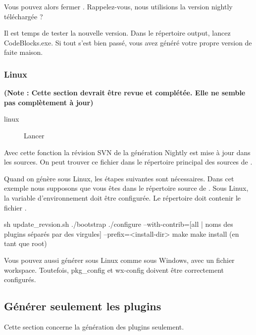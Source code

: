 Vous pouvez alors fermer \codeblocks. Rappelez-vous, nous utilisions la version nightly téléchargée ?

Il est temps de tester la nouvelle version. Dans le répertoire output, lancez CodeBlocks.exe. Si tout s'est bien passé, vous avez généré votre propre version de \codeblocks faite maison.

\subsubsection{Linux}

\textbf{(Note : Cette section devrait être revue et complétée. Elle ne semble pas complètement à jour)}

\begin{description}
\item[linux] Lancer 
\end{description}

Avec cette fonction la révision SVN de la génération Nightly est mise à jour dans les sources. On peut trouver ce fichier dans le répertoire principal des sources de \codeblocks.

Quand on génère sous Linux, les étapes suivantes sont nécessaires. Dans cet exemple nous supposons que vous êtes dans le répertoire source de \codeblocks.  Sous Linux, la variable d'environnement  doit être configurée. Le répertoire  doit contenir le fichier . 



\begin{cmd}
sh update_revsion.sh
./bootstrap
./configure --with-contrib=[all | noms des plugins séparés par des virgules]
     --prefix=<install-dir>
make
make install (en tant que root)
\end{cmd}

Vous pouvez aussi générer sous Linux comme sous Windows, avec un fichier workspace. Toutefois, pkg\_config et wx-config doivent être correctement configurés.

\subsection{Générer seulement les plugins}

Cette section concerne la génération des plugins seulement.

